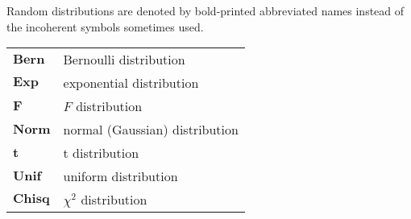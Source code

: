 \vspace{\baselineskip}
\noindent Random distributions are denoted by bold-printed abbreviated names instead of the incoherent symbols sometimes used.
\vspace{\baselineskip}

\begin{tabular}{ll}
  $\mathbf{Bern}$   & Bernoulli distribution \\
  $\mathbf{Exp}$    & exponential distribution \\
  $\mathbf{F}$      & $F$ distribution \\
  $\mathbf{Norm}$   & normal (Gaussian) distribution \\
  $\mathbf{t}$      & t distribution \\
  $\mathbf{Unif}$   & uniform distribution \\
  $\mathbf{Chisq}$  & $\chi^2$ distribution \\
\end{tabular} 
